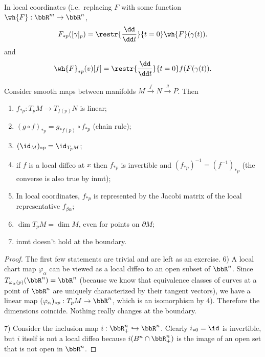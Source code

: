 \begin{rem}
    In local coordinates (i.e.~replacing $F$ with some function $\wh{F}:\bbR^m\to\bbR^n$,
    \[F_{\ast p}([\gamma]_p)=\restr{\frac{\dd}{\dd t}}{t=0} \wh{F}(\gamma(t)).\label{eq differential in local coordinates}\]
    and 
    \[\wh{F}_{\ast p}(v)[f]=\restr{\frac{\dd}{\dd t}}{t=0}f(F(\gamma(t)).\]
\end{rem}


\begin{thm}\label{prop of push-forwards}
Consider smooth maps between manifolds $M\overset{f}{\to}N\overset{g}{\to}P$. Then
\begin{enumerate}
    \item $f_{\ast p}:T_p M\to T_{f(p)} N$ is linear;
    \item $(g\circ f)_{\ast p}=g_{\ast f(p)}\circ f_{\ast p}$ (chain rule);
    \item $(\id_M)_{\ast p}=\id_{T_p M}$;
    \item if $f$ is a local diffeo at $x$ then $f_{\ast p}$ is invertible and $(f_{\ast p})^{-1}=(f^{-1})_{\ast p}$ (the converse is also true by \gls{inmt});
    \item In local coordinates, $f_{\ast p}$ is represented by the Jacobi matrix of the local representative $f_{\beta\alpha}$;
    \item $\dim T_p M=\dim M$, even for points on $\partial M$;
    \item \gls{inmt} doesn't hold at the boundary.
\end{enumerate}
\end{thm}
\begin{proof}
The first few statements are trivial and are left as an exercise.
6) A local chart map $\varphi_\alpha$ can be viewed as a local diffeo to an open subset of $\bbR^n$. Since $T_{\varphi_\alpha(p)}(\bbR^n)=\bbR^n$ (because we know that equivalence classes of curves at a point of $\bbR^n$ are uniquely characterized by their tangent vectors), we have a linear map $(\varphi_\alpha)_{\ast p}:T_p M\to \bbR^n$, which is an isomorphism by 4). Therefore the dimensions coincide. Nothing really changes at the boundary.

7) Consider the inclusion map $i:\bbR^n_+\hookrightarrow \bbR^n$. Clearly $i_{\ast 0}=\id$ is invertible, but $i$ itself is not a local diffeo because $i(B^n\cap \bbR^n_+)$ is the image of an open set that is not open in $\bbR^n$.
\end{proof}

